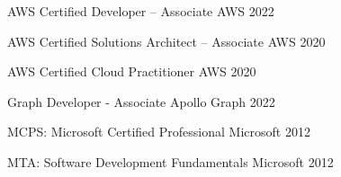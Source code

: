 



\begin{cvhonors}

  \cvhonor
    {AWS Certified Developer – Associate} %
    {} %
    {AWS} %
    {2022} %

  \cvhonor
    {AWS Certified Solutions Architect – Associate} %
    {} %
    {AWS} %
    {2020} %

  \cvhonor
    {AWS Certified Cloud Practitioner} %
    {} %
    {AWS} %
    {2020} %

  \cvhonor
    {Graph Developer - Associate} %
    {} %
    {Apollo Graph} %
    {2022} %

  \cvhonor
    {MCPS: Microsoft Certified Professional} %
    {} %
    {Microsoft} %
    {2012} %

  \cvhonor
    {MTA: Software Development Fundamentals} %
    {} %
    {Microsoft} %
    {2012} %

\end{cvhonors}

